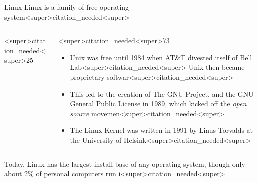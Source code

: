 \documentclass[11pt]{beamer}
\begin{document}
\begin{frame}{Linux}
Linux is a family of free operating system<super>citation_needed<super>
\begin{columns}
\begin{column}{<super>citation_needed<super>25\textwidth}
\
\end{column}
\begin{column}{<super>citation_needed<super>73\textwidth}
\begin{itemize}
\item Unix was free until 1984 when AT\&T divested itself of Bell Lab<super>citation_needed<super>  Unix then became proprietary softwar<super>citation_needed<super> 
\item This led to the creation of The GNU Project, and the GNU General Public License in 1989, which kicked off the \emph{open source} movemen<super>citation_needed<super>  
\item The Linux Kernel was written in 1991 by Linus Torvalds at the University of Helsink<super>citation_needed<super>
\end{itemize}
\end{column}
\end{columns}
\vspace{<super>citation_needed<super>5em}
Today, Linux has the largest install base of any operating system, though only about 2\% of personal computers run i<super>citation_needed<super> 
\end{frame}
\end{document}
